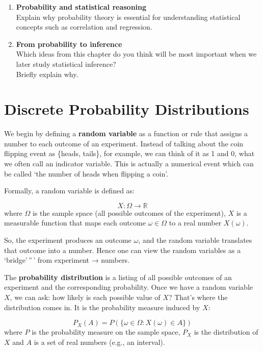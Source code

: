 \documentclass[
  letterpaper,
  DIV=11,
  numbers=noendperiod]{scrreprt}
\begin{document}
\begin{enumerate}
\def\labelenumi{\arabic{enumi}.}
\setcounter{enumi}{19}
\item
  \textbf{Probability and statistical reasoning}\\
  Explain why probability theory is essential for understanding
  statistical concepts such as correlation and regression.
\item
  \textbf{From probability to inference}\\
  Which ideas from this chapter do you think will be most important when
  we later study statistical inference?\\
  Briefly explain why.
\end{enumerate}


\chapter{Discrete Probability Distributions}\label{ch8}

We begin by defining a \textbf{random variable} as a function or rule
that assigns a number to each outcome of an experiment. Instead of
talking about the coin flipping event as \{heads, tails\}, for example,
we can think of it as 1 and 0, what we often call an indicator variable.
This is actually a numerical event which can be called `the number of
heads when flipping a coin'.

Formally, a random variable is defined as:

\[
X: \Omega \to \mathbb{R}
\] where \(\Omega\) is the sample space (all possible outcomes of the
experiment), \(X\) is a measurable function that maps each outcome
\(\omega \in \Omega\) to a real number \(X(\omega)\).

So, the experiment produces an outcome \(\omega\), and the random
variable translates that outcome into a number. Hence one can view the
random variables as a `bridge'\,''\,' from experiment → numbers.

The \textbf{probability distribution} is a listing of all possible
outcomes of an experiment and the corresponding probability. Once we
have a random variable \(X\), we can ask: how likely is each possible
value of \(X\)? That's where the distribution comes in. It is the
probability measure induced by \(X\):

\[
P_X(A)=P(\{\omega \in \Omega: X(\omega) \in A \})
\] where \(P\) is the probability measure on the sample space, \(P_X\)
is the distribution of \(X\) and \(A\) is a set of real numbers (e.g.,
an interval).
\end{document}
